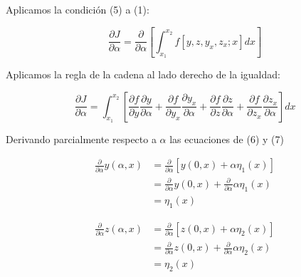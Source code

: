 
\vspace{0.5cm}

Aplicamos la condición (5) a (1):

\begin{equation*}
    \frac{\partial J}{\partial \alpha} =
    \frac{\partial}{\partial \alpha}
    \left[
        \int_{x_{1}}^{x_{2}}
        f\left[ y, z, y_{x}, z_{x}; x \right]
        dx
        \right]
\end{equation*}

\vspace*{0.5cm}

Aplicamos la regla de la cadena al lado derecho de la igualdad:

\vspace*{0.5cm}

\begin{equation}
    \frac{\partial J}{\partial \alpha} =
    \int_{x_{1}}^{x_{2}}
    \left[
        \frac{\partial f}{\partial y} \frac{\partial y}{\partial \alpha} +
        \frac{\partial f}{\partial y_{x}} \frac{\partial y_{x}}{\partial \alpha} +
        \frac{\partial f}{\partial z} \frac{\partial z}{\partial \alpha} +
        \frac{\partial f}{\partial z_{x}} \frac{\partial z_{x}}{\partial \alpha}
        \right]
    dx
\end{equation}

\vspace*{0.5cm}

Derivando parcialmente respecto a $\alpha$ las ecuaciones de (6) y (7)

\begin{align*}
    \frac{\partial}{\partial \alpha} y(\alpha,x) & = \frac{\partial}{\partial \alpha} \left[ y(0,x) + \alpha \eta_{1} (x) \right]                    \\
                                                 & = \frac{\partial}{\partial \alpha}  y(0,x) + \frac{\partial}{\partial \alpha} \alpha \eta_{1} (x) \\
                                                 & = \eta_{1} (x)
\end{align*}

\vspace*{0.5cm}

\begin{align*}
    \frac{\partial}{\partial \alpha} z(\alpha,x) & = \frac{\partial}{\partial \alpha} \left[ z(0,x) + \alpha \eta_{2} (x) \right]                    \\
                                                 & = \frac{\partial}{\partial \alpha}  z(0,x) + \frac{\partial}{\partial \alpha} \alpha \eta_{2} (x) \\
                                                 & = \eta_{2} (x)
\end{align*}

